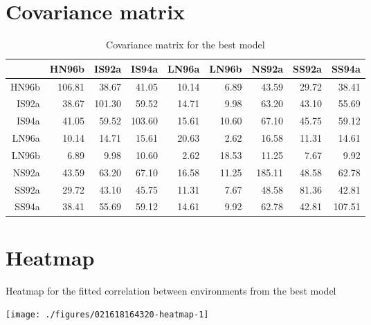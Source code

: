 \documentclass[a4paper,11pt]{article}\usepackage[]{graphicx}\usepackage[]{color}
\newenvironment{knitrout}{}{} %
\begin{document}
\clearpage
\section{Covariance matrix}
\begin{table}[ht]
\begin{flushleft}
\caption{Covariance matrix for the best model} 
\begin{tabular}{rrrrrrrrr}
  \hline
 & HN96b & IS92a & IS94a & LN96a & LN96b & NS92a & SS92a & SS94a \\ 
  \hline
HN96b & 106.81 & 38.67 & 41.05 & 10.14 & 6.89 & 43.59 & 29.72 & 38.41 \\ 
  IS92a & 38.67 & 101.30 & 59.52 & 14.71 & 9.98 & 63.20 & 43.10 & 55.69 \\ 
  IS94a & 41.05 & 59.52 & 103.60 & 15.61 & 10.60 & 67.10 & 45.75 & 59.12 \\ 
  LN96a & 10.14 & 14.71 & 15.61 & 20.63 & 2.62 & 16.58 & 11.31 & 14.61 \\ 
  LN96b & 6.89 & 9.98 & 10.60 & 2.62 & 18.53 & 11.25 & 7.67 & 9.92 \\ 
  NS92a & 43.59 & 63.20 & 67.10 & 16.58 & 11.25 & 185.11 & 48.58 & 62.78 \\ 
  SS92a & 29.72 & 43.10 & 45.75 & 11.31 & 7.67 & 48.58 & 81.36 & 42.81 \\ 
  SS94a & 38.41 & 55.69 & 59.12 & 14.61 & 9.92 & 62.78 & 42.81 & 107.51 \\ 
   \hline
\end{tabular}
\end{flushleft}
\end{table}


\section{Heatmap}
Heatmap for the fitted correlation between environments from the best model
\begin{knitrout}
\color{fgcolor}

\texttt{[image: ./figures/021618164320-heatmap-1]} \hfill{}



\end{knitrout}

\end{document}
